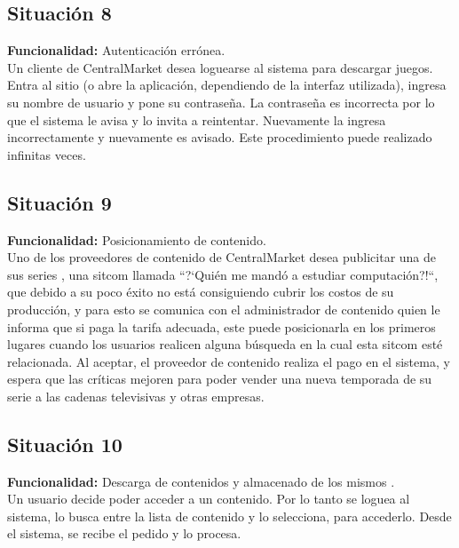 \documentclass[11pt, a4paper, spanish]{article}
\begin{document}
\subsection{Situaci\'on 8}

	\textbf{Funcionalidad:} Autenticaci\'on err\'onea.\\

	Un cliente de CentralMarket desea loguearse al sistema para descargar juegos. Entra al sitio (o abre la aplicaci\'on, dependiendo de la interfaz 
   utilizada), ingresa su nombre de usuario y pone su contrase\~{n}a. La contrase\~{n}a es incorrecta por lo que el sistema le avisa y lo invita a reintentar. 
   Nuevamente la ingresa incorrectamente y nuevamente es avisado.
   Este procedimiento puede realizado infinitas veces.

\subsection{Situaci\'on 9}

	\textbf{Funcionalidad:} Posicionamiento de contenido.\\

	Uno de los proveedores de contenido de CentralMarket desea publicitar una de sus series , una sitcom llamada ``?`Qui\'en me mand\'o a estudiar    
   computaci\'on?!``, que debido a su poco \'exito no est\'a consiguiendo cubrir los costos de su producci\'on, y para esto se comunica con el administrador de 
   contenido quien le informa que si paga la tarifa adecuada, este puede posicionarla en los primeros lugares cuando los usuarios realicen alguna    
   b\'usqueda en la cual esta sitcom est\'e relacionada. Al aceptar, el proveedor de contenido realiza el pago en el sistema, y espera que las cr\'iticas    
   mejoren para poder vender una nueva temporada de su serie a las cadenas televisivas y otras empresas. 


\subsection{Situaci\'on 10}

	\textbf{Funcionalidad:} Descarga de contenidos y almacenado de los mismos .\\

	Un usuario decide poder acceder a un contenido. Por lo tanto se loguea al sistema, lo busca entre la lista de contenido y lo selecciona, para 
   accederlo. Desde el sistema, se recibe el pedido y lo procesa.\\
\end{document}
